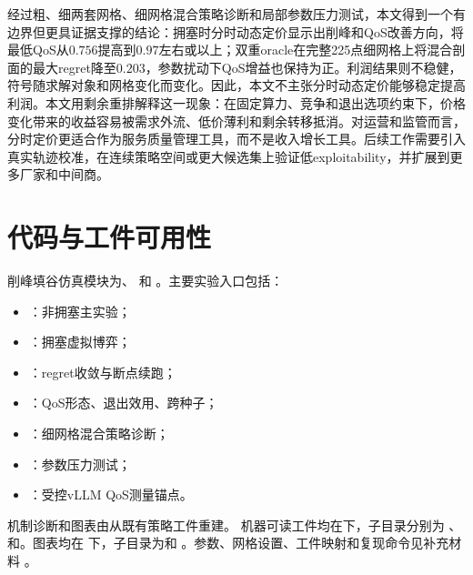 \documentclass[UTF8,11pt]{ctexart}
\begin{document}
经过粗、细两套网格、细网格混合策略诊断和局部参数压力测试，本文得到一个有边界但更具证据支撑的结论：拥塞时分时动态定价显示出削峰和QoS改善方向，将最低QoS从$0.756$提高到$0.97$左右或以上；双重oracle在完整225点细网格上将混合剖面的最大regret降至$0.203$，参数扰动下QoS增益也保持为正。利润结果则不稳健，符号随求解对象和网格变化而变化。因此，本文不主张分时动态定价能够稳定提高利润。本文用剩余重排解释这一现象：在固定算力、竞争和退出选项约束下，价格变化带来的收益容易被需求外流、低价薄利和剩余转移抵消。对运营和监管而言，分时定价更适合作为服务质量管理工具，而不是收入增长工具。后续工作需要引入真实轨迹校准，在连续策略空间或更大候选集上验证低exploitability，并扩展到更多厂家和中间商。

\section*{代码与工件可用性}
削峰填谷仿真模块为、
和
。主要实验入口包括：
\begin{itemize}[leftmargin=2em]
  \item {}：非拥塞主实验；
  \item {}：拥塞虚拟博弈；
  \item {}：regret收敛与断点续跑；
  \item {}：QoS形态、退出效用、跨种子；
  \item {}：细网格混合策略诊断；
  \item {}：参数压力测试；
  \item {}：受控vLLM QoS测量锚点。
\end{itemize}
机制诊断和图表由从既有策略工件重建。
机器可读工件均在下，子目录分别为
、和。图表均在
下，子目录为和
。参数、网格设置、工件映射和复现命令见补充材料
。

\small


\end{document}

